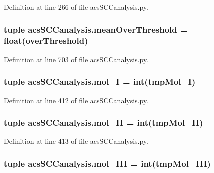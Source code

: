 Definition at line 266 of file acs\-S\-C\-Canalysis.\-py.

\hypertarget{a00102_af10c3623be709892f4bdc4df5a3d52b0}{
\subsubsection[{mean\-Over\-Threshold}]{\setlength{\rightskip}{0pt plus 5cm}tuple acs\-S\-C\-Canalysis.\-mean\-Over\-Threshold = float({\bf over\-Threshold})}}\label{a00102_af10c3623be709892f4bdc4df5a3d52b0}


Definition at line 703 of file acs\-S\-C\-Canalysis.\-py.

\hypertarget{a00102_ae13d6607ffa236891a9af05bfa88cfcc}{
\subsubsection[{mol\-\_\-\-I}]{\setlength{\rightskip}{0pt plus 5cm}tuple acs\-S\-C\-Canalysis.\-mol\-\_\-\-I = int(tmp\-Mol\-\_\-\-I)}}\label{a00102_ae13d6607ffa236891a9af05bfa88cfcc}


Definition at line 412 of file acs\-S\-C\-Canalysis.\-py.

\hypertarget{a00102_a8f2878f5909e4aeb9155a1103eaba413}{
\subsubsection[{mol\-\_\-\-I\-I}]{\setlength{\rightskip}{0pt plus 5cm}tuple acs\-S\-C\-Canalysis.\-mol\-\_\-\-I\-I = int(tmp\-Mol\-\_\-\-I\-I)}}\label{a00102_a8f2878f5909e4aeb9155a1103eaba413}


Definition at line 413 of file acs\-S\-C\-Canalysis.\-py.

\hypertarget{a00102_a20047e8516f386a7e98ffa0efec09471}{
\subsubsection[{mol\-\_\-\-I\-I\-I}]{\setlength{\rightskip}{0pt plus 5cm}tuple acs\-S\-C\-Canalysis.\-mol\-\_\-\-I\-I\-I = int(tmp\-Mol\-\_\-\-I\-I\-I)}}\label{a00102_a20047e8516f386a7e98ffa0efec09471}


